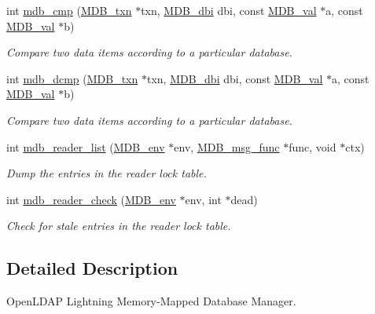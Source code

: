 \begin{DoxyCompactItemize}
int \mbox{\hyperlink{group__mdb_gaba790a2493f744965b810efac73bac0e}{mdb\+\_\+cmp}} (\mbox{\hyperlink{struct_m_d_b__txn}{M\+D\+B\+\_\+txn}} $\ast$txn, \mbox{\hyperlink{group__mdb_gadbe68a06c448dfb62da16443d251a78b}{M\+D\+B\+\_\+dbi}} dbi, const \mbox{\hyperlink{struct_m_d_b__val}{M\+D\+B\+\_\+val}} $\ast$a, const \mbox{\hyperlink{struct_m_d_b__val}{M\+D\+B\+\_\+val}} $\ast$b)
\begin{DoxyCompactList}\small\item\em Compare two data items according to a particular database. \end{DoxyCompactList}\item 
int \mbox{\hyperlink{group__mdb_gac61d3087282b0824c8c5caff6caabdf3}{mdb\+\_\+dcmp}} (\mbox{\hyperlink{struct_m_d_b__txn}{M\+D\+B\+\_\+txn}} $\ast$txn, \mbox{\hyperlink{group__mdb_gadbe68a06c448dfb62da16443d251a78b}{M\+D\+B\+\_\+dbi}} dbi, const \mbox{\hyperlink{struct_m_d_b__val}{M\+D\+B\+\_\+val}} $\ast$a, const \mbox{\hyperlink{struct_m_d_b__val}{M\+D\+B\+\_\+val}} $\ast$b)
\begin{DoxyCompactList}\small\item\em Compare two data items according to a particular database. \end{DoxyCompactList}\item 
int \mbox{\hyperlink{group__mdb_ga8550000cd0501a44f57ee6dff0188744}{mdb\+\_\+reader\+\_\+list}} (\mbox{\hyperlink{struct_m_d_b__env}{M\+D\+B\+\_\+env}} $\ast$env, \mbox{\hyperlink{group__mdb_ga02f6d37e96b28c8feed7e467f3414863}{M\+D\+B\+\_\+msg\+\_\+func}} $\ast$func, void $\ast$ctx)
\begin{DoxyCompactList}\small\item\em Dump the entries in the reader lock table. \end{DoxyCompactList}\item 
int \mbox{\hyperlink{group__mdb_ga366923d08bb384b3d9580a98edf5d668}{mdb\+\_\+reader\+\_\+check}} (\mbox{\hyperlink{struct_m_d_b__env}{M\+D\+B\+\_\+env}} $\ast$env, int $\ast$dead)
\begin{DoxyCompactList}\small\item\em Check for stale entries in the reader lock table. \end{DoxyCompactList}\end{DoxyCompactItemize}


\subsection{Detailed Description}
Open\+L\+D\+AP Lightning Memory-\/\+Mapped Database Manager. 



